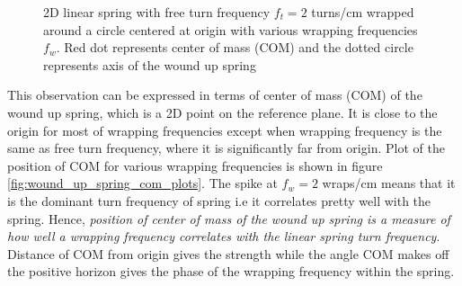 \documentclass[11pt, a4paper]{article}
\begin{document}
\begin{figure}[H]
{
		}\hfill
		
		\caption{2D linear spring with free turn frequency $f_{t} = 2$ turns/cm wrapped around a circle centered at origin with various wrapping frequencies $f_{w}$. Red dot represents center of mass (COM) and the dotted circle represents axis of the wound up spring}
		\label{fig:wound_up_spring_plots}
	\end{figure}

	This observation can be expressed in terms of center of mass (COM) of the wound up spring, which is a 2D point on the reference plane. It is close to the origin for most of wrapping frequencies except when wrapping frequency is the same as free turn frequency, where it is significantly far from origin. Plot of the position of COM for various wrapping frequencies is shown in figure \ref{fig:wound_up_spring_com_plots}. The spike at $f_{w} = 2$ wraps/cm means that it is the dominant turn frequency of spring i.e it correlates pretty well with the spring. Hence, \textit{position of center of mass of the wound up spring is a measure of how well a wrapping frequency correlates with the linear spring turn frequency}. Distance of COM from origin gives the strength while the angle COM makes off the positive horizon gives the phase of the wrapping frequency within the spring.
	
\end{document}
